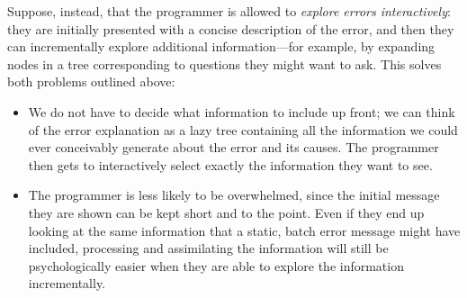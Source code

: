 \documentclass[sigplan, screen]{acmart}\settopmatter{printccs=false,printacmref=false}
\begin{document}
Suppose, instead, that the programmer is allowed to \emph{explore errors
  interactively}: they are initially presented with a concise
description of the error, and then they can incrementally explore
additional information---for example, by expanding nodes in a tree
corresponding to questions they might want to ask.  This solves both
problems outlined above:
\begin{itemize}
\item We do not have to decide what information to include up front;
  we can think of the error explanation as a lazy tree containing all
  the information we could ever conceivably generate about the error
  and its causes.  The programmer then gets to interactively select
  exactly the information they want to see.
\item The programmer is less likely to be overwhelmed, since the
  initial message they are shown can be kept short and to the point.
  Even if they end up looking at the same information that a static,
  batch error message might have included, processing and assimilating
  the information will still be psychologically easier when they
  are able to explore the information incrementally.
\end{itemize}


\end{document}
